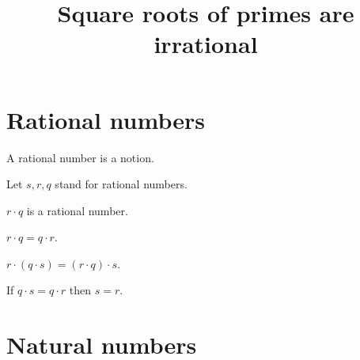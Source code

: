 \documentclass{article}
\title{Square roots of primes are irrational}
\author{}
\date{}
\begin{document}
  \maketitle

  \section*{Rational numbers}

  \begin{forthel}

    \begin{signature}
      A rational number is a notion.
    \end{signature}

    Let $s,r,q$ stand for rational numbers.

    \begin{signature}
      $r \cdot q$ is a rational number.
    \end{signature}

    \begin{axiom}
      $r \cdot q = q \cdot r$.
    \end{axiom}

    \begin{axiom}
      $r \cdot (q \cdot s) = (r \cdot q) \cdot s$.
    \end{axiom}

    \begin{axiom}
      If $q \cdot s = q \cdot r$ then $s = r$.
    \end{axiom}
  \end{forthel}

  \section*{Natural numbers}
\end{document}
